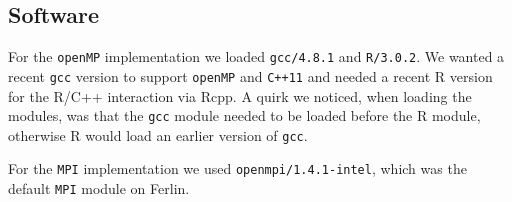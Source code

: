 \subsection{Software}
For the \texttt{openMP} implementation we loaded
\texttt{gcc/4.8.1} and \texttt{R/3.0.2}. We wanted a recent
\texttt{gcc} version to support \texttt{openMP} and \texttt{C++11} and needed a recent R
version for the R/C++ interaction via Rcpp. A quirk we noticed, when
loading the modules, was that the \texttt{gcc} module needed to be loaded before
the R module, otherwise R would load an earlier version of \texttt{gcc}.

For the \texttt{MPI} implementation we used
\texttt{openmpi/1.4.1-intel}, which was the default \texttt{MPI}
module on Ferlin.











